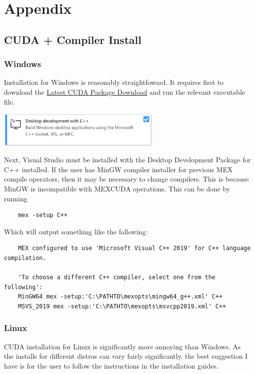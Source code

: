 \documentclass[11pt,letterpaper]{article}
\begin{document}
\section{Appendix}

\subsection{CUDA + Compiler Install}

\label{sec:compilerinstall}
\subsubsection{Windows}
Installation for Windows is reasonably straightfoward. It requires first to download the \href{https://developer.nvidia.com/cuda-downloads?target_os=Windows&target_arch=x86_64}{Latest CUDA Package Download} and run the relevant executable file.\\

\begin{center}
    \includegraphics[width = 0.6\textwidth]{Windows_Compiler.png}
\end{center}

Next, Visual Studio must be installed with the Desktop Development Package for C++ installed. If the user has MinGW compiler installer for previous MEX compile operators, then it may be necessary to change compilers. This is because MinGW is incompatible with MEXCUDA operations. This can be done by running

\begin{verbatim}
    mex -setup C++
\end{verbatim}

Which will output something like the following:

\begin{verbatim}
    MEX configured to use 'Microsoft Visual C++ 2019' for C++ language compilation.

    'To choose a different C++ compiler, select one from the following':
    MinGW64 mex -setup:'C:\PATHTO\mexopts\mingw64_g++.xml' C++
    MSVS_2019 mex -setup:'C:\PATHTO\mexopts\msvcpp2019.xml' C++ 
\end{verbatim}


\subsubsection{Linux}
CUDA installation for Linux is significantly more annoying than Windows. As the installs for different distros can vary fairly significantly, the best suggestion I have is for the user to follow the instructions in the installation guides.\\
\end{document}
